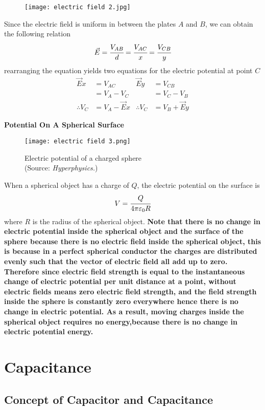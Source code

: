 \documentclass{article}
\begin{document}
\begin{figure}[H]
    \centering
    \texttt{[image: electric field 2.jpg]}
\end{figure}
Since the electric field is uniform in between the plates $A$ and $B$, we can obtain the following relation
$$\vec{E}=\cfrac{V_{AB}}{d}=\cfrac{V_{AC}}{x}=\cfrac{V_{CB}}{y}$$
rearranging the equation yields two equations for the electric potential at point $C$
\begin{align*}
    \vec{E}x&=V_{AC}  & \vec{E}y&=V_{CB} \\
    &= V_A-V_C &  &=V_C-V_B\\ 
    \therefore V_C&=V_A-\vec{E}x  & \therefore V_C&=V_B+\vec{E}y
\end{align*}

\begin{flushleft}
 \textbf{Potential On A Spherical Surface}
\end{flushleft}
\begin{figure}[H]
    \centering
    \captionsetup{justification=centering,margin=2cm}
    \texttt{[image: electric field 3.png]}
    \caption*{Electric potential of a charged sphere \\(Source: \textit{Hyperphysics.})}
\end{figure}
When a spherical object has a charge of $Q$, the electric potential on the surface is
$$V=\cfrac{Q}{4\pi\varepsilon_0R}$$
where $R$ is the radius of the spherical object. \textbf{Note that there is no change in electric potential inside the spherical object and the surface of the sphere because there is no electric field inside the spherical object, this is because in a perfect spherical conductor the charges are distributed evenly such that the vector of electric field all add up to zero. Therefore since electric field strength is equal to the instantaneous change of electric potential per unit distance at a point, without electric fields means zero electric field strength, and the field strength inside the sphere is constantly zero everywhere hence there is no change in electric potential. As a result, moving charges inside the spherical object requires no energy,because there is no change in electric potential energy.}

\newpage

\section{Capacitance}

 \subsection{Concept of Capacitor and Capacitance}
\end{document}
